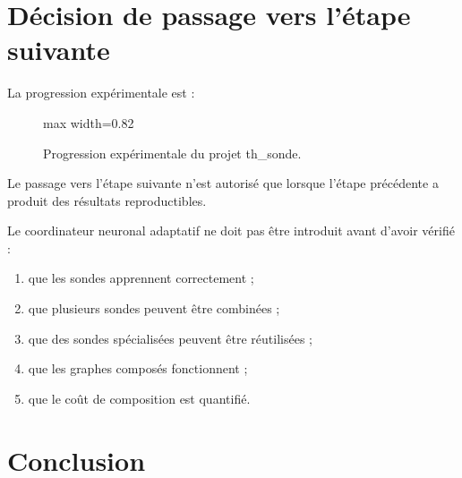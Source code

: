 \documentclass[11pt,a4paper]{article}
\begin{document}
\section{Décision de passage vers l'étape suivante}

La progression expérimentale est :

\begin{figure}[H]
\centering
\begin{adjustbox}{max width=0.82\textwidth}
\end{adjustbox}
\caption{Progression expérimentale du projet th\_sonde.}
\end{figure}

Le passage vers l'étape suivante n'est autorisé
que lorsque l'étape précédente a produit des résultats
reproductibles.

Le coordinateur neuronal adaptatif ne doit pas être
introduit avant d'avoir vérifié :
\begin{enumerate}
    \item que les sondes apprennent correctement ;
    \item que plusieurs sondes peuvent être combinées ;
    \item que des sondes spécialisées peuvent être réutilisées ;
    \item que les graphes composés fonctionnent ;
    \item que le coût de composition est quantifié.
\end{enumerate}

\section{Conclusion}
\end{document}
